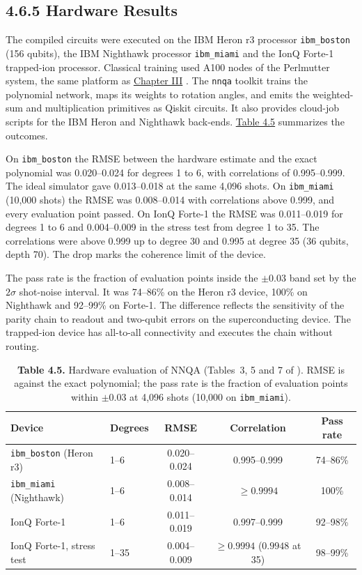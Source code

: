 \documentclass{report}
\theoremstyle{plain}
\theoremstyle{definition}
\theoremstyle{remark}
\begin{document}
\subsection{4.6.5 Hardware Results}\label{sec:qml:nnqa:hw}

The compiled circuits were executed on the IBM Heron r3 processor \texttt{ibm\_boston} (156 qubits), the IBM Nighthawk processor \texttt{ibm\_miami} and the IonQ Forte-1 trapped-ion processor. Classical training used A100 nodes of the Perlmutter system, the same platform as \hyperref[ch:qgear]{Chapter III} \cite{guo2026nnqa}. The \texttt{nnqa} toolkit trains the polynomial network, maps its weights to rotation angles, and emits the weighted-sum and multiplication primitives as Qiskit circuits. It also provides cloud-job scripts for the IBM Heron and Nighthawk back-ends. \hyperref[tab:qml:nnqa-hw]{Table 4.5} summarizes the outcomes.

On \texttt{ibm\_boston} the RMSE between the hardware estimate and the exact polynomial was 0.020--0.024 for degrees 1 to 6, with correlations of 0.995--0.999. The ideal simulator gave 0.013--0.018 at the same 4,096 shots. On \texttt{ibm\_miami} (10,000 shots) the RMSE was 0.008--0.014 with correlations above 0.999, and every evaluation point passed. On IonQ Forte-1 the RMSE was 0.011--0.019 for degrees 1 to 6 and 0.004--0.009 in the stress test from degree 1 to 35. The correlations were above 0.999 up to degree 30 and 0.995 at degree 35 (36 qubits, depth 70). The drop marks the coherence limit of the device.

The pass rate is the fraction of evaluation points inside the $\pm0.03$ band set by the $2\sigma$ shot-noise interval. It was 74--86\% on the Heron r3 device, 100\% on Nighthawk and 92--99\% on Forte-1. The difference reflects the sensitivity of the parity chain to readout and two-qubit errors on the superconducting device. The trapped-ion device has all-to-all connectivity and executes the chain without routing.

\begin{table}[htbp]
\caption{\textbf{Table 4.5.} Hardware evaluation of NNQA (Tables~3, 5 and 7 of \cite{guo2026nnqa}). RMSE is against the exact polynomial; the pass rate is the fraction of evaluation points within $\pm0.03$ at 4,096 shots (10,000 on \texttt{ibm\_miami}).}\label{tab:qml:nnqa-hw}
 
\small
\begin{tabular}{llccc}
\toprule
Device & Degrees & RMSE & Correlation & Pass rate \\
\midrule
\texttt{ibm\_boston} (Heron r3) & 1--6 & 0.020--0.024 & 0.995--0.999 & 74--86\% \\
\texttt{ibm\_miami} (Nighthawk) & 1--6 & 0.008--0.014 & $\ge 0.9994$ & 100\% \\
IonQ Forte-1 & 1--6 & 0.011--0.019 & 0.997--0.999 & 92--98\% \\
IonQ Forte-1, stress test & 1--35 & 0.004--0.009 & $\ge 0.9994$ ($0.9948$ at 35) & 98--99\% \\
\bottomrule
\end{tabular}
\end{table}
\end{document}

